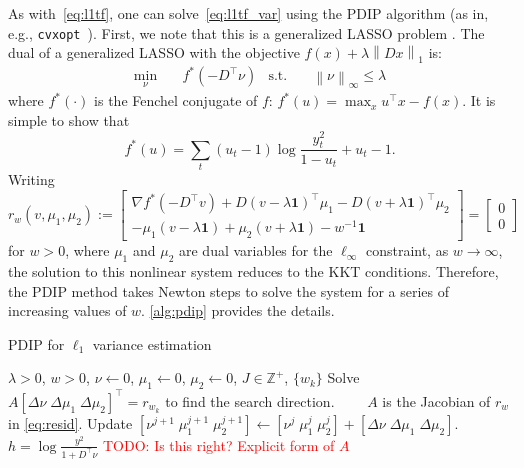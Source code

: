 \documentclass{article}
\newcommand{\attn}[1]{\textcolor{red}{TODO: #1}}
\newcommand{\one}{\mathbf{1}}
\newcommand{\norm}[1]{\left\lVert #1 \right\rVert}
\begin{document}
As with~\eqref{eq:l1tf}, one can solve~\eqref{eq:l1tf_var} using the
PDIP algorithm (as in, e.g.,
\texttt{cvxopt}~\citep{andersen_cvxopt:_2013}). First, we note that
this is a generalized LASSO problem
\citep{tibshirani_solution_2011}. The dual of a generalized LASSO with
the objective $f(x)+\lambda \norm{ Dx }_1$ is:  
\begin{align}
\min_\nu&\quad f^*(-D^\top\nu) & \mbox{s.t.}&\quad \norm{ \nu }_\infty \le \lambda
\end{align}
 where $f^*(\cdot)$ is the Fenchel conjugate of $f$: $f^*(u)=\max_x
 u^\top x-f(x)$. It is simple to show that 
\begin{equation}
f^*(u)=\sum_t (u_t-1)\log\frac{y_t^2}{1-u_t} + u_t-1.
\label{eq:conj}
\end{equation}
Writing
\begin{equation}
  r_w(v,\mu_1,\mu_2):=
  \begin{bmatrix}
    \nabla f^*(-D^\top v) + D(v-\lambda \one)^\top \mu_1 -
    D(v+\lambda \one)^\top \mu_2\\
    -\mu_1(v-\lambda\one)+\mu_2(v + \lambda\one) -w^{-1}\one
  \end{bmatrix}
  =
  \begin{bmatrix}
  0\\0\end{bmatrix}
\label{eq:resid}
\end{equation}
for $w>0$, where $\mu_1$ and $\mu_2$ are dual variables for the
$\ell_\infty$ constraint, as $w\rightarrow\infty$,
the solution to this nonlinear system reduces to the KKT
conditions. Therefore, the PDIP method takes Newton steps to solve the
system for a series of increasing values of $w$. \autoref{alg:pdip}
provides the details. 
\begin{algorithm}[tb]
  \caption{PDIP for $\ell_1$ variance estimation}
  \label{alg:pdip}
  \begin{algorithmic}
    \REQUIRE $\lambda>0$, $w>0$, $\nu\leftarrow 0$, $\mu_1\leftarrow
    0$, $\mu_2\leftarrow 0$, $J\in\mathbb{Z}^+$, $\{w_k\}$
    \STATE Solve $A [\Delta\nu\; \Delta\mu_1\; \Delta\mu_2]^\top=r_{w_k}$ to find the search direction.
    \STATE $\quad\quad A$ is the Jacobian of $r_w$ in \eqref{eq:resid}.
    \STATE Update $[\nu^{j+1}\; \mu^{j+1}_1\; \mu^{j+1}_2] \leftarrow
    [\nu^{j}\; \mu^{j}_1\; \mu^{j}_2] + [\Delta\nu\; \Delta\mu_1\;
    \Delta\mu_2]$. 
    \ENDFOR
   \ENDFOR
   \RETURN $h=\log\frac{y^2}{1+D^\top\nu}$ \attn{Is this right?
     Explicit form of $A$}
  \end{algorithmic}
\end{algorithm}
\end{document}
